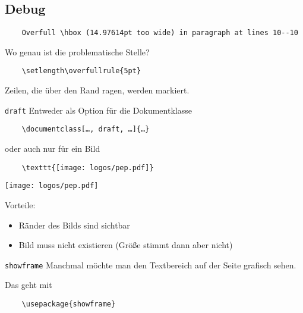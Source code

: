 \subsection{Debug}

\begin{frame}[fragile]{}

  \vspace{\baselineskip}
  \begin{verbatim}
    Overfull \hbox (14.97614pt too wide) in paragraph at lines 10--10
  \end{verbatim}
  Wo genau ist die problematische Stelle?

  \vspace{\baselineskip}
  \begin{verbatim}
    \setlength\overfullrule{5pt}
  \end{verbatim}

  \setlength\overfullrule{5pt}

  \vspace{\baselineskip}
  Zeilen, die über den Rand ragen, werden markiert.
\end{frame}

\begin{frame}[fragile]{\texttt{draft}}
  Entweder als Option für die Dokumentklasse
  \begin{verbatim}
    \documentclass[…, draft, …]{…}
  \end{verbatim}
  oder auch nur für ein Bild
  \begin{verbatim}
    \texttt{[image: logos/pep.pdf]}
  \end{verbatim}
  \texttt{[image: logos/pep.pdf]}

  Vorteile:
  \begin{itemize}
    \item Ränder des Bilds sind sichtbar
    \item Bild muss nicht existieren (Größe stimmt dann aber nicht)
  \end{itemize}
\end{frame}

\AddToShipoutPictureFG*{\ShowFramePicture}
\begin{frame}[fragile]{\texttt{showframe}}
  Manchmal möchte man den Textbereich auf der Seite grafisch sehen.

  Das geht mit
  \begin{verbatim}
    \usepackage{showframe}
  \end{verbatim}
\end{frame}

